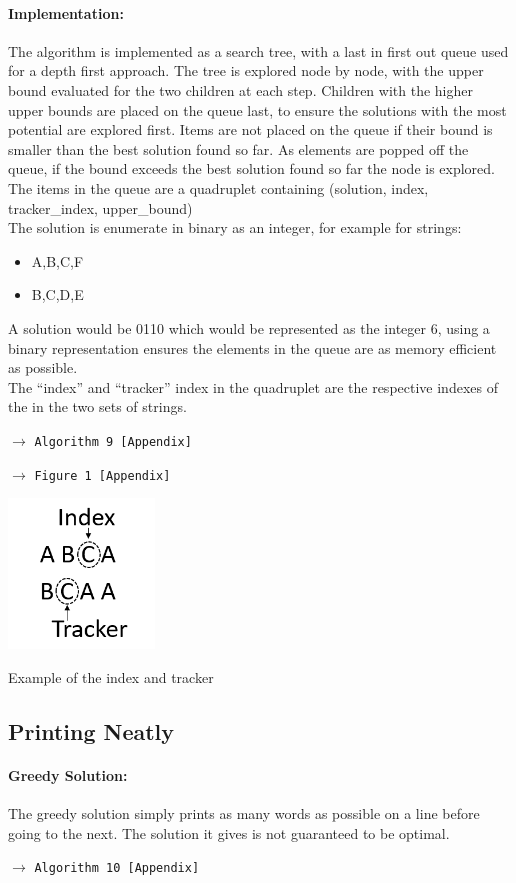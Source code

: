 \documentclass[a4paper,12pt]{article}
\newcommand{\see}[1]{\begin{flushright}$\rightarrow$ \texttt{#1 [Appendix]}\end{flushright}}
\newcommand{\seeAlgorithm}[1]{\see{Algorithm #1}}
\newcommand{\seeFigure}[1]{\see{Figure #1}}
\begin{document}
				\paragraph{Implementation:} The algorithm is implemented as a search tree, with a last in first out queue used for a depth first approach. The tree is explored node by node, with the upper bound evaluated for the two children at each step. Children with the higher upper bounds are placed on the queue last, to ensure the solutions with the most potential are explored first. Items are not placed on the queue if their bound is smaller than the best solution found so far. As elements are popped off the queue, if the bound exceeds the best solution found so far the node is explored.  The items in the queue are a quadruplet containing (solution, index, tracker\_index, upper\_bound) \\
				The solution is enumerate in binary as an integer, for example for strings:
				\begin{itemize}
					\item A,B,C,F
					\item B,C,D,E
				\end{itemize}
				A solution would be 0110 which would be represented as the integer 6, using a binary representation ensures the elements in the queue are as memory efficient as possible.\\
				The ``index'' and ``tracker'' index in the quadruplet are the respective indexes of the in the two sets of strings.
				\seeAlgorithm{9}
				\seeFigure{1}
				\begin{center}
					\includegraphics[height=4cm]{include/index-tracker.png}
				\end{center}
				{\footnotesize{Example of the index and tracker}}

		\subsection{Printing Neatly}

			\paragraph{Greedy Solution:} The greedy solution simply prints as many words as possible on a line before going to the next. The solution it gives is not guaranteed to be optimal.
				\seeAlgorithm{10}
\end{document}
